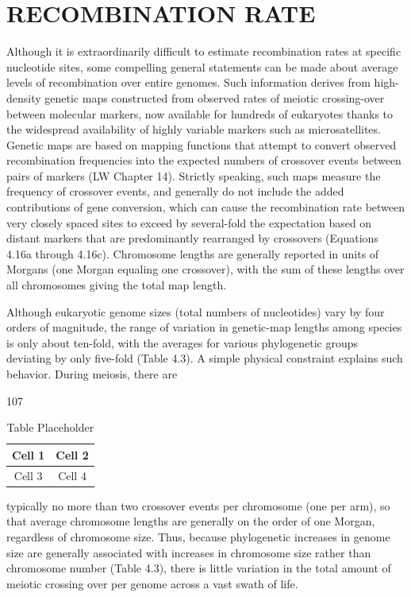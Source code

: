 \documentclass{article}
\begin{document}
\section{RECOMBINATION RATE}
Although it is extraordinarily difficult to estimate recombination rates at specific nucleotide sites, some compelling general statements can be made about average levels of recombination over entire genomes. Such information derives from high-density genetic maps constructed from observed rates of meiotic crossing-over between molecular markers, now available for hundreds of eukaryotes thanks to the widespread availability of highly variable markers such as microsatellites. Genetic maps are based on mapping functions that attempt to convert observed recombination frequencies into the expected numbers of crossover events between pairs of markers (LW Chapter 14). Strictly speaking, such maps measure the frequency of crossover events, and generally do not include the added contributions of gene conversion, which can cause the recombination rate between very closely spaced sites to exceed by several-fold the expectation based on distant markers that are predominantly rearranged by crossovers (Equations 4.16a through 4.16c). Chromosome lengths are generally reported in units of Morgans (one Morgan equaling one crossover), with the sum of these lengths over all chromosomes giving the total map length.

Although eukaryotic genome sizes (total numbers of nucleotides) vary by four orders of magnitude, the range of variation in genetic-map lengths among species is only about ten-fold, with the averages for various phylogenetic groups deviating by only five-fold (Table 4.3). A simple physical constraint explains such behavior. During meiosis, there are

107

\begin{table}[h]
\centering
\begin{tabular}{|c|c|}
\hline
Cell 1 & Cell 2 \\
\hline
Cell 3 & Cell 4 \\
\hline
\end{tabular}
\caption{Table Placeholder}
\end{table}

typically no more than two crossover events per chromosome (one per arm), so that average chromosome lengths are generally on the order of one Morgan, regardless of chromosome size. Thus, because phylogenetic increases in genome size are generally associated with increases in chromosome size rather than chromosome number (Table 4.3), there is little variation in the total amount of meiotic crossing over per genome across a vast swath of life.
\end{document}

